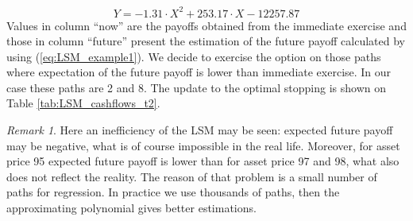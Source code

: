 \documentclass[a4paper,11pt, twoside]{book}
\theoremstyle{definition}
\theoremstyle{remark}
\newtheorem{remark}{Remark}[chapter]
\newcounter{example}[chapter]
\begin{document}
\begin{equation}
 \label{eq:LSM_example1}
 Y = -1.31\cdot X^2 + 253.17\cdot X - 12257.87 
\end{equation}
Values in column ``now'' are the payoffs obtained from the immediate exercise and those in column ``future'' present the estimation of the future payoff calculated by using (\ref{eq:LSM_example1}). We decide to exercise the option on those paths where expectation of the future payoff is lower than immediate exercise. In our case these paths are 2 and 8. The update to the optimal stopping is shown on Table \ref{tab:LSM_cashflows_t2}.

\begin{remark}
 Here an inefficiency of the LSM may be seen: expected future payoff may be negative, what is of course impossible in the real life. Moreover, for asset price 95 expected future payoff is lower than for asset price 97 and 98, what also does not reflect the reality. The reason of that problem is a small number of paths for regression. In practice we use thousands of paths, then the approximating polynomial gives better estimations.
\end{remark}
\end{document}
